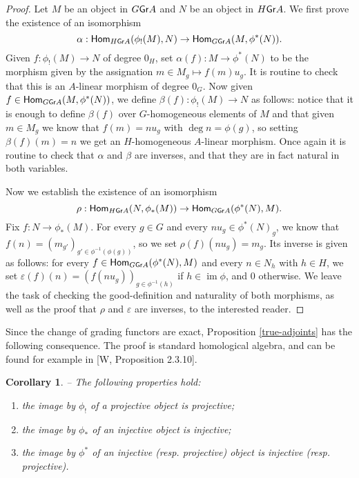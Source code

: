 \documentclass[twoside,11pt]{article}
\newcommand{\GrMod}{{\sf Gr}}
\newcommand{\Hom}{{\sf Hom}}
\newtheorem{subcorollary}[subtheorem]{Corollary}
\begin{document}
\begin{proof} Let $M$ be an object in $G \GrMod A$ and $N$ be an object in $H\GrMod A$. 
We first prove the existence of an isomorphism
\[
	\alpha: \Hom_{H\GrMod A}(\phi_!(M),N) \to \Hom_{G\GrMod A}(M,\phi^*(N)).
\]
Given $f: \phi_!(M) \to N$ of degree $0_H$, set $\alpha(f): M \to \phi^*(N)$ to be the
morphism given by the assignation $m \in M_g \mapsto f(m)u_g$. It is routine to check that
this is an $A$-linear morphism of degree $0_G$. Now given $f \in \Hom_{G\GrMod
A}(M,\phi^*(N))$, we define $\beta(f): \phi_!(M) \to N$ as follows: notice that it is
enough to define $\beta(f)$ over $G$-homogeneous elements of $M$ and that given
$m \in M_g$ we know that $f(m) = n u_g$ with $\deg n = \phi(g)$, so setting $\beta(f)(m) =
n$ we get an $H$-homogeneous $A$-linear morphism. Once again it is routine to check that
$\alpha$ and $\beta$ are inverses, and that they are in fact natural in both variables. 

Now we establish the existence of an isomorphism
\[
	\rho: \Hom_{H\GrMod A}(N,\phi_*(M)) \to \Hom_{G\GrMod A}(\phi^*(N), M).
\]
Fix $f: N \to \phi_*(M)$. For every $g \in G$ and every $nu_g \in \phi^*(N)_g$, we know
that $f(n) = (m_{g'})_{g' \in \phi^{-1}(\phi(g))}$, so we set $\rho(f)(n u_g) = m_g$. Its
inverse is given as follows: for every $f \in \Hom_{G\GrMod A}(\phi^*(N), M)$ and every $n
\in N_h$ with $h \in H$, we set $\varepsilon(f)(n) = (f(nu_g))_{g \in \phi^{-1}(h)}$ if $h
\in \operatorname{im} \phi$, and $0$ otherwise. We leave the task of checking the
good-definition and naturality of both morphisms, as well as the proof that $\rho$ and
$\varepsilon$ are inverses, to the interested reader.
\end{proof}

Since the change of grading functors are exact, Proposition \ref{true-adjoints} has the
following consequence. The proof is standard homological algebra, and can be found for
example in [W, Proposition 2.3.10].
\begin{subcorollary} -- \label{proj-inj-functors} The following properties hold:
\begin{enumerate}
\item the image by $\phi_!$ of a projective object is projective; 
\item the image by $\phi_*$ of an injective object is injective;
\item the image by $\phi^*$ of an injective (resp. projective) object is injective (resp.
projective).
\end{enumerate}
\end{subcorollary}
\end{document}
